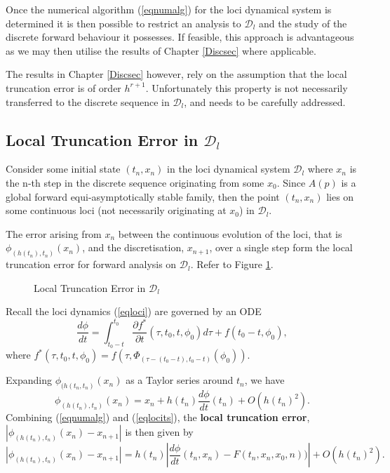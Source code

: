 Once the numerical algorithm (\ref{eqnumalg}) for the loci dynamical system is
determined it is then possible to restrict an analysis to $\mathcal{D}_l$ and
the study of the discrete forward behaviour it possesses. If feasible, this
approach is advantageous as we may then utilise the results of
Chapter \ref{Discsec} where applicable.

The results in Chapter \ref{Discsec} however, rely on the assumption that the
local truncation error is of order $h^{r+1}$. Unfortunately this property
is not necessarily transferred to the discrete sequence in $\mathcal{D}_l$, and
needs to be carefully addressed.

\subsection{Local Truncation Error in $\mathcal{D}_l$}

Consider some initial state $(t_n, x_n)$ in the loci dynamical system
$\mathcal{D}_l$ where $x_n$ is the n-th step in the discrete sequence
originating from some $x_0$. Since $A(p)$ is a global
forward equi-asymptotically stable family, then the point $(t_n, x_n)$ lies on
some continuous loci (not necessarily originating at $x_0$) in $\mathcal{D}_l$.

The error arising from $x_n$ between the continuous evolution of the loci,
that is $\phi_{(h(t_n), t_n)}(x_n)$, and the discretisation,
$x_{n+1}$, over a single step form the local truncation error for forward
analysis on $\mathcal{D}_l$. Refer to Figure \ref{pdisc2}.

\begin{figure}[h]
\begin{center}
 \caption{Local Truncation Error in $\mathcal{D}_l$}
\protect\label{pdisc2}
\end{center}
\end{figure}

Recall the loci dynamics (\ref{eqloci}) are governed by an ODE
\begin{equation*}
 \frac{d\phi}{dt} = \int_{t_0 - t}^{t_0}\frac{\partial f^*}{\partial t}(\tau,
   t_0, t, \phi_0) d\tau + f( t_0 - t, \phi_0),
\end{equation*}
where $f^*(\tau, t_0, t, \phi_0) = f( \tau, \Phi_{(\tau
- (t_0 - t),  t_0 - t)}(\phi_0))$.

Expanding $\phi_{(h(t_n, t_n)}(x_n)$ as a Taylor series around
$t_n$, we have
\begin{equation} \label{eqlocits}
  \phi_{(h(t_n), t_n)}(x_n) = x_n + h(t_n)
                      \dfrac{d \phi}{dt}(t_n) + O(h(t_n)^2).
\end{equation}
Combining (\ref{eqnumalg}) and (\ref{eqlocits}), the \textbf{local truncation
error}, $|\phi_{(h(t_n), t_n)}(x_n) - x_{n+1}|$ is then given by
\begin{equation} \label{eqterrordl}
|\phi_{(h(t_n), t_n)}(x_n) - x_{n+1}| = h(t_n) \left| \dfrac{d \phi}{dt}(t_n,
               x_n) - F(t_n, x_n, x_0, n))\right| + O(h(t_n)^2).
\end{equation}

